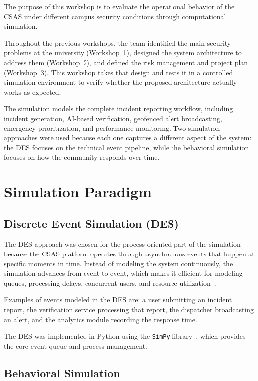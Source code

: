 \documentclass[conference,a4paper,10pt]{IEEEtran}
\begin{document}
The purpose of this workshop is to evaluate the operational behavior of
the CSAS under different campus security conditions through
computational simulation.

Throughout the previous workshops, the team identified the main
security problems at the university (Workshop~1), designed the system
architecture to address them (Workshop~2), and defined the risk
management and project plan (Workshop~3). This workshop takes that
design and tests it in a controlled simulation environment to verify
whether the proposed architecture actually works as expected.

The simulation models the complete incident reporting workflow,
including incident generation, AI-based verification, geofenced alert
broadcasting, emergency prioritization, and performance monitoring.
Two simulation approaches were used because each one captures a
different aspect of the system: the DES focuses on the technical
event pipeline, while the behavioral simulation focuses on how the
community responds over time.

\section{Simulation Paradigm}

\subsection{Discrete Event Simulation (DES)}

The DES approach was chosen for the process-oriented part of the
simulation because the CSAS platform operates through asynchronous
events that happen at specific moments in time. Instead of modeling
the system continuously, the simulation advances from event to event,
which makes it efficient for modeling queues, processing delays,
concurrent users, and resource utilization~\cite{law2015simulation}.

Examples of events modeled in the DES are: a user submitting an
incident report, the verification service processing that report,
the dispatcher broadcasting an alert, and the analytics module
recording the response time.

The DES was implemented in Python using the \texttt{SimPy}
library~\cite{simpy}, which provides the core event queue and
process management.

\subsection{Behavioral Simulation}
\end{document}
